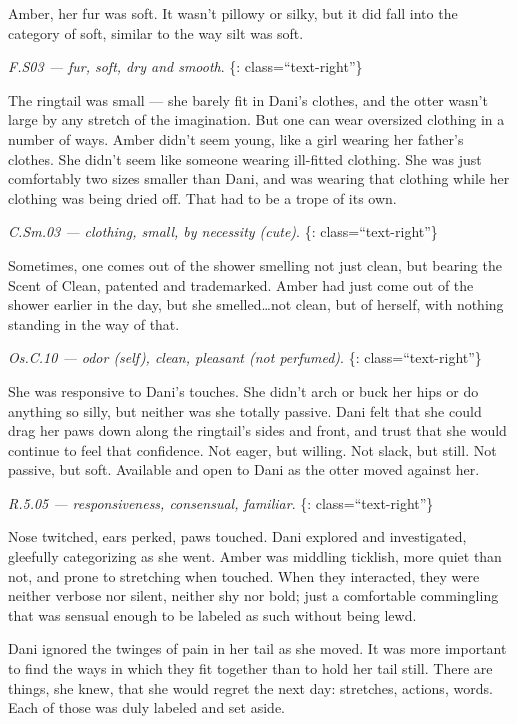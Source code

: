 Amber, her fur was soft. It wasn't pillowy or silky, but it did fall into the category of soft, similar to the way silt was soft.

\emph{F.S03 --- fur, soft, dry and smooth}. \{: class=``text-right''\}

The ringtail was small --- she barely fit in Dani's clothes, and the otter wasn't large by any stretch of the imagination. But one can wear oversized clothing in a number of ways. Amber didn't seem young, like a girl wearing her father's clothes. She didn't seem like someone wearing ill-fitted clothing. She was just comfortably two sizes smaller than Dani, and was wearing that clothing while her clothing was being dried off. That had to be a trope of its own.

\emph{C.Sm.03 --- clothing, small, by necessity (cute)}. \{: class=``text-right''\}

Sometimes, one comes out of the shower smelling not just clean, but bearing the Scent of Clean, patented and trademarked. Amber had just come out of the shower earlier in the day, but she smelled\ldots{}not clean, but of herself, with nothing standing in the way of that.

\emph{Os.C.10 --- odor (self), clean, pleasant (not perfumed)}. \{: class=``text-right''\}

She was responsive to Dani's touches. She didn't arch or buck her hips or do anything so silly, but neither was she totally passive. Dani felt that she could drag her paws down along the ringtail's sides and front, and trust that she would continue to feel that confidence. Not eager, but willing. Not slack, but still. Not passive, but soft. Available and open to Dani as the otter moved against her.

\emph{R.5.05 --- responsiveness, consensual, familiar}. \{: class=``text-right''\}

Nose twitched, ears perked, paws touched. Dani explored and investigated, gleefully categorizing as she went. Amber was middling ticklish, more quiet than not, and prone to stretching when touched. When they interacted, they were neither verbose nor silent, neither shy nor bold; just a comfortable commingling that was sensual enough to be labeled as such without being lewd.

Dani ignored the twinges of pain in her tail as she moved. It was more important to find the ways in which they fit together than to hold her tail still. There are things, she knew, that she would regret the next day: stretches, actions, words. Each of those was duly labeled and set aside.

